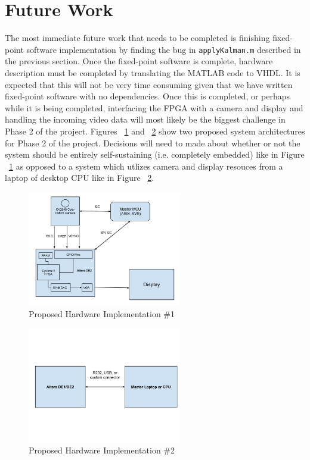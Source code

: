 \documentclass[12pt]{article} %
\begin{document}
\section{Future Work}
The most immediate future work that needs to be completed is finishing fixed-point software implementation by finding the bug in \texttt{applyKalman.m} described in the previous section. Once the fixed-point software is complete, hardware description must be completed by translating the MATLAB code to VHDL. It is expected that this will not be very time consuming given that we have written fixed-point software with no dependencies. Once this is completed, or perhaps while it is being completed, interfacing the FPGA with a camera and display and handling the incoming video data will most likely be the biggest challenge in Phase 2 of the project. Figures ~\ref{fig:hw1} and ~\ref{fig:hw2} show two proposed system architectures for Phase 2 of the project. Decisions will need to made about whether or not the system should be entirely self-sustaining (i.e. completely embedded) like in Figure ~\ref{fig:hw1} as opposed to a system which utlizes camera and display resouces from a laptop of desktop CPU like in Figure ~\ref{fig:hw2}.
\begin{figure}[h]
\centering
\includegraphics[width=0.6\textwidth]{./images/hw_layout_1.jpg}
\caption{Proposed Hardware Implementation \#1}
\label{fig:hw1}    
\end{figure}
\begin{figure}[h]
\centering
\includegraphics[width=0.6\textwidth]{./images/hw_layout_2.jpg}
\caption{Proposed Hardware Implementation \#2}
\label{fig:hw2}    
\end{figure}
\end{document}
